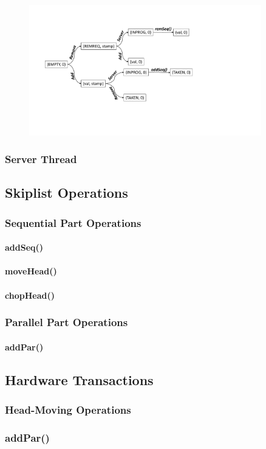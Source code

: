 \begin{figure}[htb]
	\centering
	\includegraphics[width=0.9\textwidth]{graphics/combining-state.pdf}
	\caption{\cite{calciu_adaptive_2014}}
	\label{fig:pqe}
\end{figure}

\subsubsection{Server Thread}

\subsection{Skiplist Operations}

\subsubsection{Sequential Part Operations}

\paragraph{addSeq()}

\paragraph{moveHead()}

\paragraph{chopHead()}

\subsubsection{Parallel Part Operations}

\paragraph{addPar()}

\subsection{Hardware Transactions}

\subsubsection{Head-Moving Operations}

\subsubsection{addPar()}
